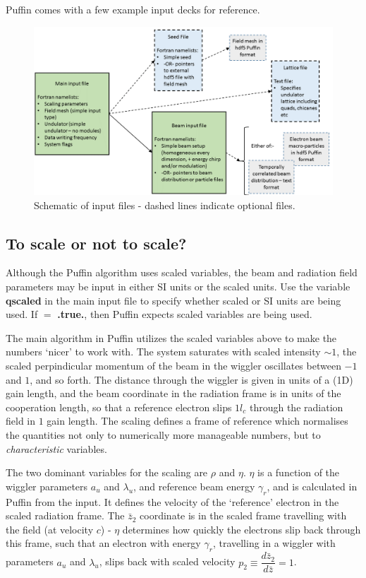 \documentclass[12pt]{article}%
\begin{document}
Puffin comes with a few example input decks for reference.

\begin{figure}
\centering
\includegraphics[width=120mm]{InputFiles.png}
\caption{Schematic of input files - dashed lines indicate optional files.}
\label{inputs1}
\end{figure}




\subsection{To scale or not to scale?}

Although the Puffin algorithm uses scaled variables, the beam and radiation field parameters may be input in either SI units or the scaled units. Use the variable {\bf qscaled} in the main input file to specify whether scaled or SI units are being used. If $=$ {\bf .true.}, then Puffin expects scaled variables are being used. %

The main algorithm in Puffin utilizes the scaled variables above to make the numbers `nicer' to work with. The system saturates with scaled intensity $\sim 1$, the scaled perpindicular momentum of the beam in the wiggler oscillates between $-1$ and $1$, and so forth. The distance through the wiggler is given in units of a (1D) gain length, and the beam coordinate in the radiation frame is in units of the cooperation length, so that a reference electron slips $1l_c$ through the radiation field in $1$ gain  length. The scaling defines a frame of reference which normalises the quantities not only to numerically more manageable numbers, but to \textit{characteristic} variables.

The two dominant variables for the scaling are $\rho$ and $\eta$. $\eta$ is a function of the wiggler parameters $a_u$ and $\lambda_u$, and reference beam energy $\gamma_r$, and is calculated in Puffin from the input. It defines the velocity of the `reference' electron in the scaled radiation frame. The $\bar{z}_2$ coordinate is in the scaled frame travelling with the field (at velocity $c$) - $\eta$ determines how quickly the electrons slip back through this frame, such that an electron with energy $\gamma_r$, travelling in a wiggler with parameters $a_u$ and $\lambda_u$, slips back with scaled velocity $p_2 \equiv \dfrac{d \bar{z}_2}{d\bar{z}} = 1$.
\end{document}
